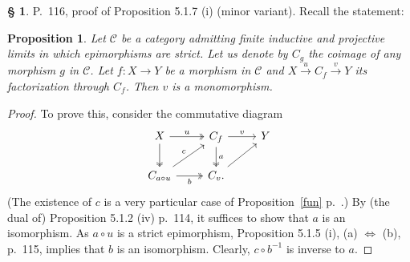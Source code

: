 \documentclass[12pt]{article}
\newtheorem{prop}[thm]{Proposition}
\theoremstyle{remark}
\theoremstyle{definition}
\newtheorem{s}[thm]{\S}
\newcommand{\C}{\mathcal C}
\newcommand{\xr}{\xrightarrow}
\newcommand{\mv}{ (minor variant)}
\begin{document}
%
%
\begin{s} 
P.~116, proof of Proposition 5.1.7 (i)\mv. Recall the statement: 
%
\begin{prop} 
Let $\C$ be a category admitting finite inductive and projective limits in which epimorphisms are strict. Let us denote by $C_g$ the coimage of any morphism $g$ in $\C$. Let $f:X\to Y$ be a morphism in $\C$ and $X\xr u C_f\xr v Y$ its factorization through $C_f$. Then $v$ is a monomorphism. 
\end{prop}
%
\begin{proof}
To prove this, consider the commutative diagram
$$
\begin{tikzcd}
X\ar[two heads]{d}\ar[two heads]{r}{u}&C_f\ar[two heads]{d}{a}\ar{r}{v}&Y\\
C_{a\circ u}\ar{ur}{c}\ar[two heads]{r}[swap]{b}&C_v.\ar{ru}
\end{tikzcd}
$$ 
(The existence of $c$ is a very particular case of Proposition~\ref{fun} p.~\pageref{fun}.) 
By (the dual of) Proposition 5.1.2 (iv) p.~114, it suffices to show that $a$ is an isomorphism. As $a\circ u$ is a strict epimorphism, Proposition 5.1.5 (i), (a) $\iff$ (b), p.~115, implies that $b$ is an isomorphism. Clearly, $c\circ b^{-1}$ is inverse to $a$.
\end{proof}
\end{s}
%
%
\end{document}

